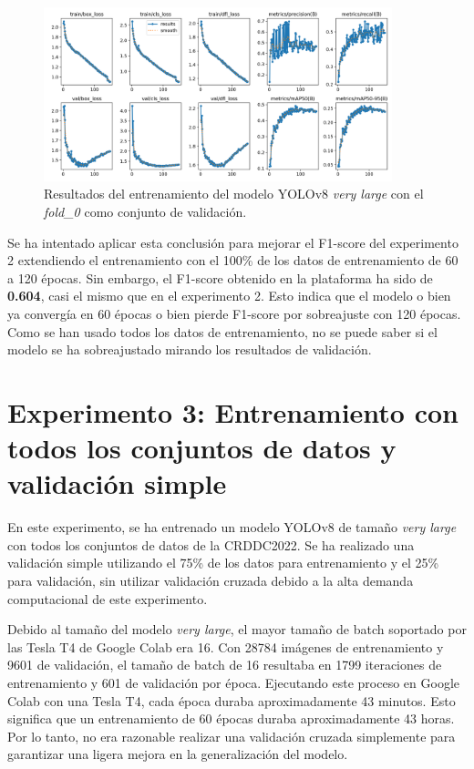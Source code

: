 \begin{figure}[H]
    \centering
    \includegraphics[width=0.9\textwidth]{img/exp2b-results.png}
    \caption{Resultados del entrenamiento del modelo YOLOv8 \textit{very large} con el \textit{fold\_0} como conjunto de validación.}
    \label{fig:exp2b-results}
\end{figure}

Se ha intentado aplicar esta conclusión para mejorar el F1-score del experimento 2 extendiendo el entrenamiento con el 100\% de los datos de entrenamiento de 60 a 120 épocas. Sin embargo, el F1-score obtenido en la plataforma ha sido de \textbf{0.604}, casi el mismo que en el experimento 2. Esto indica que el modelo o bien ya convergía en 60 épocas o bien pierde F1-score por sobreajuste con 120 épocas. Como se han usado todos los datos de entrenamiento, no se puede saber si el modelo se ha sobreajustado mirando los resultados de validación.


\section{Experimento 3: Entrenamiento con todos los conjuntos de datos y validación simple}\label{SEC:EXP3}

En este experimento, se ha entrenado un modelo YOLOv8 de tamaño \textit{very large} con todos los conjuntos de datos de la CRDDC2022. Se ha realizado una validación simple utilizando el 75\% de los datos para entrenamiento y el 25\% para validación, sin utilizar validación cruzada debido a la alta demanda computacional de este experimento.

Debido al tamaño del modelo \textit{very large}, el mayor tamaño de batch soportado por las Tesla T4 de Google Colab era 16. Con 28784 imágenes de entrenamiento y 9601 de validación, el tamaño de batch de 16 resultaba en 1799 iteraciones de entrenamiento y 601 de validación por época. Ejecutando este proceso en Google Colab con una Tesla T4, cada época duraba aproximadamente 43 minutos. Esto significa que un entrenamiento de 60 épocas duraba aproximadamente 43 horas. Por lo tanto, no era razonable realizar una validación cruzada simplemente para garantizar una ligera mejora en la generalización del modelo.

